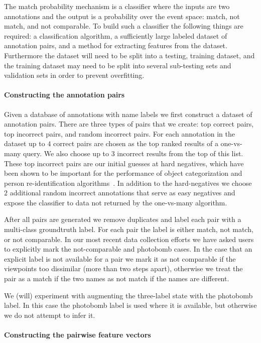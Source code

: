 The match probability mechanism is a classifier where the inputs are two
  annotations and the output is a probability over the event space:
match, not match, and not comparable.
To build such a classifier the following things are required:
a classification algorithm, a sufficiently large labeled dataset of annotation
  pairs, and a method for extracting features from the dataset.
Furthermore the dataset will need to be split into a testing, training
  dataset, and the training dataset may need to be split into several
  sub-testing sets and validation sets in order to prevent overfitting.


\paragraph{Constructing the annotation pairs}
Given a database of annotations with name labels we first construct a dataset
  of annotation pairs.
There are three types of pairs that we create:
top correct pairs, top incorrect pairs, and random incorrect pairs.
For each annotation in the dataset up to $4$ correct pairs are chosen as the
  top ranked results of a one-vs-many query.
We also choose up to $3$ incorrect results from the top of this list.
These top incorrect pairs are our initial guesses at hard negatives, which
  have been shown to be important for the performance of object categorization
  and person re-identification algorithms~\cite{shi_embedding_2016,
  felzenszwalb_object_2010}.
In addition to the hard-negatives we choose $2$ additional random incorrect
  annotations that serve as easy negatives and expose the classifier to data not
  returned by the one-vs-many algorithm.

After all pairs are generated we remove duplicates and label each pair with a
  multi-class groundtruth label.
For each pair the label is either match, not match, or not comparable.
In our most recent data collection efforts we have asked users to explicitly
  mark the not-comparable and photobomb cases.
In the case that an explicit label is not available for a pair we mark it as
  not comparable if the viewpoints too dissimilar (more than two steps apart),
  otherwise we treat the pair as a match if the two names as not match if the
  names are different.

We (will) experiment with augmenting the three-label state with the photobomb
  label.
In this case the photobomb label is used where it is available, but otherwise
  we do not attempt to infer it.


\paragraph{Constructing the pairwise feature vectors}

